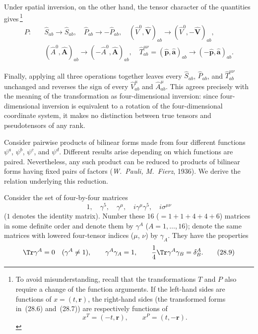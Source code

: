 Under spatial inversion, on the other hand, the tensor character of the quantities gives\,\footnote{To avoid misunderstanding, recall that the transformations $T$ and $P$ also require a change of the function arguments. If the left-hand sides are functions of $x = (t,\mathbf{r})$, the right-hand sides (the transformed forms in~(28.6) and~(28.7)) are respectively functions of
\[
x^T = (-t,\mathbf{r}),\qquad x^P = (t,-\mathbf{r}).
\]}
\begin{equation}
\begin{aligned}
P:\quad &\widehat S_{ab} \to \widehat S_{ab},\quad \widehat P_{ab} \to -\widehat P_{ab},\quad (\widehat V^0,\widehat{\mathbf{V}})_{ab} \to (\widehat V^0,-\widehat{\mathbf{V}})_{ab},\\
&(\widehat A^0,\widehat{\mathbf{A}})_{ab} \to (-\widehat A^0,\widehat{\mathbf{A}})_{ab},\quad \widehat T^{\mu\nu}_{ab} = (\widehat{\mathbf{p}},\widehat{\mathbf{a}})_{ab} \to (-\widehat{\mathbf{p}},\widehat{\mathbf{a}})_{ab}.
\end{aligned}
\tag{28.7}
\end{equation}

Finally, applying all three operations together leaves every $\widehat S_{ab}$, $\widehat P_{ab}$, and $\widehat T^{\mu\nu}_{ab}$ unchanged and reverses the sign of every $\widehat V^\mu_{ab}$ and $\widehat A^\mu_{ab}$. This agrees precisely with the meaning of the transformation as four-dimensional inversion: since four-dimensional inversion is equivalent to a rotation of the four-dimensional coordinate system, it makes no distinction between true tensors and pseudotensors of any rank.

Consider pairwise products of bilinear forms made from four different functions $\psi^a$, $\psi^b$, $\psi^c$, and $\psi^d$. Different results arise depending on which functions are paired. Nevertheless, any such product can be reduced to products of bilinear forms having fixed pairs of factors (\emph{W.~Pauli, M.~Fierz}, 1936). We derive the relation underlying this reduction.

Consider the set of four-by-four matrices
\begin{equation}
1,\quad \gamma^5,\quad \gamma^\mu,\quad i\gamma^\mu\gamma^5,\quad i\sigma^{\mu\nu}
\tag{28.8}
\end{equation}
($1$ denotes the identity matrix). Number these $16$ ($= 1 + 1 + 4 + 4 + 6$) matrices in some definite order and denote them by $\gamma^A$ ($A = 1,\ldots,16$); denote the same matrices with lowered four-tensor indices ($\mu$, $\nu$) by $\gamma_A$. They have the properties
\begin{equation}
\Tr\gamma^A = 0\quad (\gamma^A \neq 1),\qquad \gamma^A\gamma_A = 1,\qquad \frac{1}{4}\Tr\gamma^A\gamma_B = \delta^A_B.
\tag{28.9}
\end{equation}

